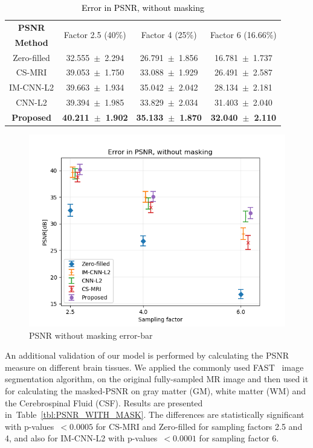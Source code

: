 \documentclass[review]{elsarticle}
\begin{document}
\begin{table}[H]
	\centering{}
	\begin{tabular}{|c||c||c||c|}
		\hline 
		\textbf{PSNR} & \multicolumn{1}{c||}{\multirow{2}{*}{Factor 2.5 (40\%)}} & \multicolumn{1}{c||}{\multirow{2}{*}{Factor 4 (25\%)}} & \multicolumn{1}{c|}{\multirow{2}{*}{Factor 6 (16.66\%)}} \tabularnewline
		\textbf{Method} & \multicolumn{1}{c||}{} & \multicolumn{1}{c||}{} & \multicolumn{1}{c|}{} \tabularnewline \cline{1-4}
		
		Zero-filled         &32.555~$\pm$~2.294  &26.791~$\pm$~1.856 &16.781~$\pm$~1.737\tabularnewline
		CS-MRI              &39.053~$\pm$~1.750  &33.088~$\pm$~1.929 &26.491~$\pm$~2.587\tabularnewline
		IM-CNN-L2           &39.663~$\pm$~1.934  &35.042~$\pm$~2.042 &28.134~$\pm$~2.181\tabularnewline
		CNN-L2              &39.394~$\pm$~1.985  &33.829~$\pm$~2.034 &31.403~$\pm$~2.040\tabularnewline
		\textbf{Proposed}   &\textbf{40.211~$\pm$~1.902}  &\textbf{35.133~$\pm$~1.870}   &\textbf{32.040~$\pm$~2.110}\tabularnewline
		\hline 
	\end{tabular}\caption{\textcolor{black}{\footnotesize{}{}Error in PSNR, without masking}{\footnotesize{}\label{tbl:PSNR_NO_MASK}}}
\end{table}



\begin{figure}[H]
\centering
\includegraphics[width=0.7\linewidth]{include/grp2/error_psnr_errorbar}
\caption{PSNR without masking error-bar}
\end{figure}\label{fig:error_psnr_errorbar}

An additional validation of our model is performed by calculating the PSNR measure on different brain tissues. We applied the commonly used FAST~\cite{zhang2001segmentation} image segmentation algorithm, on the original fully-sampled MR image and then used it for calculating the masked-PSNR on gray matter (GM), white matter (WM) and the Cerebrospinal Fluid (CSF). Results are presented in~Table~\ref{tbl:PSNR_WITH_MASK}. 
The differences are statistically significant with p-values~$<0.0005$ for CS-MRI and Zero-filled for sampling factors 2.5 and 4, and also for IM-CNN-L2 with p-values~$<0.0001$ for sampling factor 6.
\end{document}
